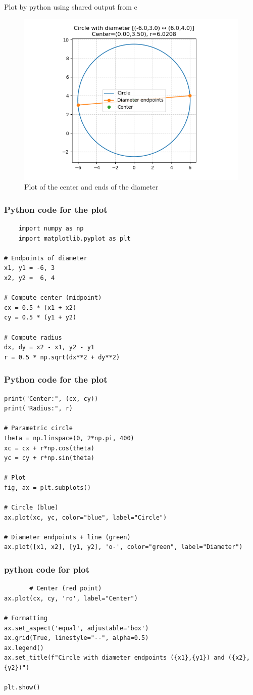 \documentclass{beamer}
\begin{document}
\begin{frame}{Plot by python using shared output from c}
	\begin{center}
	\begin{figure}[H]
		\centering
		\includegraphics[width = 0.6\columnwidth]{figs/fig1.png}
		\caption{Plot of the center and ends of the diameter}
		\label{fig1}
	\end{figure}
	\end{center}
\end{frame}
\begin{frame}[fragile]
     \frametitle{Python code for the plot}
\begin{lstlisting}
    import numpy as np
    import matplotlib.pyplot as plt

# Endpoints of diameter
x1, y1 = -6, 3
x2, y2 =  6, 4

# Compute center (midpoint)
cx = 0.5 * (x1 + x2)
cy = 0.5 * (y1 + y2)

# Compute radius
dx, dy = x2 - x1, y2 - y1
r = 0.5 * np.sqrt(dx**2 + dy**2)
\end{lstlisting}
\end{frame}
\begin{frame}[fragile]
   \frametitle{Python code for the plot}
    \begin{lstlisting}
print("Center:", (cx, cy))
print("Radius:", r)

# Parametric circle
theta = np.linspace(0, 2*np.pi, 400)
xc = cx + r*np.cos(theta)
yc = cy + r*np.sin(theta)

# Plot
fig, ax = plt.subplots()

# Circle (blue)
ax.plot(xc, yc, color="blue", label="Circle")

# Diameter endpoints + line (green)
ax.plot([x1, x2], [y1, y2], 'o-', color="green", label="Diameter")
 \end{lstlisting}
\end{frame}
 \begin{frame}[fragile]
       \frametitle{python code for plot}
       \begin{lstlisting}
       # Center (red point)
ax.plot(cx, cy, 'ro', label="Center")

# Formatting
ax.set_aspect('equal', adjustable='box')
ax.grid(True, linestyle="--", alpha=0.5)
ax.legend()
ax.set_title(f"Circle with diameter endpoints ({x1},{y1}) and ({x2},{y2})")

plt.show()
    \end{lstlisting}
 \end{frame}
\end{document}
